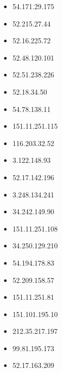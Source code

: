\documentclass{article}
\begin{document}
\begin{itemize}
            \item 54.171.29.175
        
            \item 52.215.27.44
        
            \item 52.16.225.72
        
            \item 52.48.120.101
        
            \item 52.51.238.226
        
            \item 52.18.34.50
        
            \item 54.78.138.11
        
            \item 151.11.251.115
        
            \item 116.203.32.52
        
            \item 3.122.148.93
        
            \item 52.17.142.196
        
            \item 3.248.134.241
        
            \item 34.242.149.90
        
            \item 151.11.251.108
        
            \item 34.250.129.210
        
            \item 54.194.178.83
        
            \item 52.209.158.57
        
            \item 151.11.251.81
        
            \item 151.101.195.10
        
            \item 212.35.217.197
        
            \item 99.81.195.173
        
            \item 52.17.163.209
        

\end{itemize}
\end{document}
